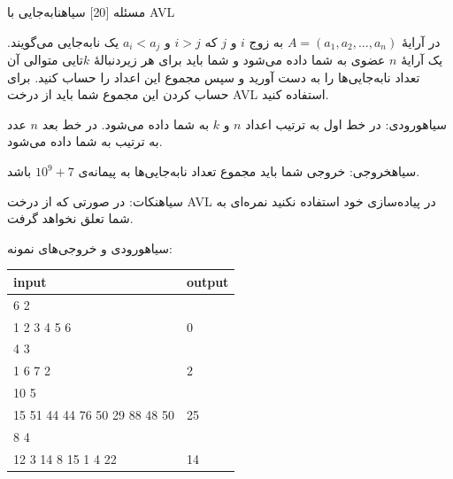 ‌مسئله [20]
‌سیاه{نابه‌جایی با AVL}

در آرایۀ $A = (a_1, a_2, ..., a_n)$ به زوج $i$ و $j$ که $i > j$ و $a_i < a_j$ یک نابه‌جایی می‌گویند. یک آرایۀ $n$ عضوی به شما داده می‌شود و شما باید برای هر زیردنبالۀ $k$تایی متوالی آن تعداد نابه‌جایی‌ها را به دست آورید و سپس مجموع این اعداد را حساب کنید. برای حساب کردن این مجموع شما باید از درخت AVL استفاده کنید.

‌سیاه{ورودی:}
در خط اول به ترتیب اعداد $n$ و $k$ به شما داده می‌شود. در خط بعد $n$ عدد به ترتیب به شما داده می‌شود.

‌سیاه{خروجی:}
خروجی شما باید مجموع تعداد نابه‌جایی‌ها به پیمانه‌ی $10^9 + 7$ باشد.

‌سیاه{نکات:}
در صورتی که از درخت AVL در پیاده‌سازی خود استفاده نکنید نمره‌ای به شما تعلق نخواهد گرفت.

‌سیاه{ورودی و خروجی‌های نمونه:}
\begin{latin}
	\begin{tabularx}{\textwidth}{|X | X|}
		\hline
		\textbf{input} &
		\textbf{output}\\
		\hline
		
		6 2 &
		\\
		
		1 2 3 4 5 6 &
		0\\
		\hline
		4 3 &
		\\
		
		1 6 7 2 &
		2\\
		\hline
		10 5&
		 \\
		
		15 51 44 44 76 50 29 88 48 50 &
		25\\
		\hline
		8 4 &
		 \\
		
		12 3 14 8 15 1 4 22&
		14\\
		
		\hline
		
	\end{tabularx}
\end{latin}



